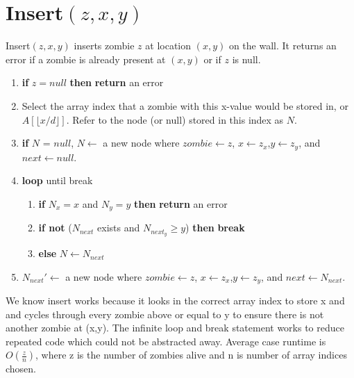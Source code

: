 \documentclass{article}
\begin{document}
\section{Insert$(z,x,y)$}
Insert$(z,x,y)$ inserts zombie $z$ at location $(x,y)$ on the wall. It returns an error if a zombie is already present at $(x,y)$ or if $z$ is null.
\begin{enumerate}
    \item \textbf{if} $z = null$ \textbf{then} \textbf{return} an error
    \item Select the array index that a zombie with this x-value would be stored in, or $A[\lfloor x/d \rfloor]$. Refer to the node (or null) stored in this index as $N$.
    \item \textbf{if} $N$ = $null$, $N \leftarrow$ a new node where $zombie \leftarrow z$, $x \leftarrow z_x$,$y \leftarrow z_y$, and $next \leftarrow null$. 
    \item \textbf{loop} until break
    \begin{enumerate}
        \item \textbf{if} $N_x = x$ and $N_y = y$ \textbf{then} \textbf{return} an error
        \item \textbf{if not} ($N_{next}$ exists and $N_{next_y}\geq y$) \textbf{then} \textbf{break}
        \item \textbf{else} $N \leftarrow N_{next}$
    \end{enumerate}
    \item $N_{next}' \leftarrow$ a new node where $zombie \leftarrow z$, $x \leftarrow z_x$,$y \leftarrow z_y$, and $next \leftarrow N_{next}$. 
\end{enumerate}
We know insert works because it looks in the correct array index to store x and and cycles through every zombie above or equal to y to ensure there is not another zombie at (x,y). The infinite loop and break statement works to reduce repeated code which could not be abstracted away. Average case runtime is $O(\frac{z}{n})$, where z is the number of zombies alive and n is number of array indices chosen.
\end{document}
